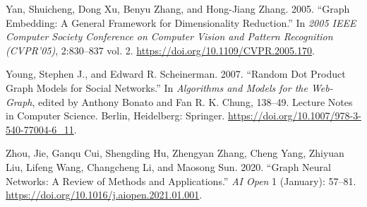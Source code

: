 \documentclass[
  letterpaper,
  DIV=11,
  numbers=noendperiod]{scrartcl}
\newlength{\cslhangindent}
\newlength{\cslentryspacingunit} %
\newenvironment{CSLReferences}[2] %
 {%
  \setlength{\parindent}{0pt}
  \ifodd #1
  \let\oldpar\par
  \def\par{\hangindent=\cslhangindent\oldpar}
  \fi
  \setlength{\parskip}{#2\cslentryspacingunit}
 }%
 {}
\begin{document}
\begin{CSLReferences}{1}{0}
\leavevmode{}%
Yan, Shuicheng, Dong Xu, Benyu Zhang, and Hong-Jiang Zhang. 2005.
{``Graph Embedding: A General Framework for Dimensionality Reduction.''}
In \emph{2005 {IEEE Computer Society Conference} on {Computer Vision}
and {Pattern Recognition} ({CVPR}'05)}, 2:830--837 vol. 2.
\url{https://doi.org/10.1109/CVPR.2005.170}.

\leavevmode{}%
Young, Stephen J., and Edward R. Scheinerman. 2007. {``Random {Dot
Product Graph Models} for {Social Networks}.''} In \emph{Algorithms and
{Models} for the {Web-Graph}}, edited by Anthony Bonato and Fan R. K.
Chung, 138--49. Lecture {Notes} in {Computer Science}. {Berlin,
Heidelberg}: {Springer}.
\url{https://doi.org/10.1007/978-3-540-77004-6_11}.

\leavevmode{}%
Zhou, Jie, Ganqu Cui, Shengding Hu, Zhengyan Zhang, Cheng Yang, Zhiyuan
Liu, Lifeng Wang, Changcheng Li, and Maosong Sun. 2020. {``Graph Neural
Networks: {A} Review of Methods and Applications.''} \emph{AI Open} 1
(January): 57--81. \url{https://doi.org/10.1016/j.aiopen.2021.01.001}.

\end{CSLReferences}
\end{document}

